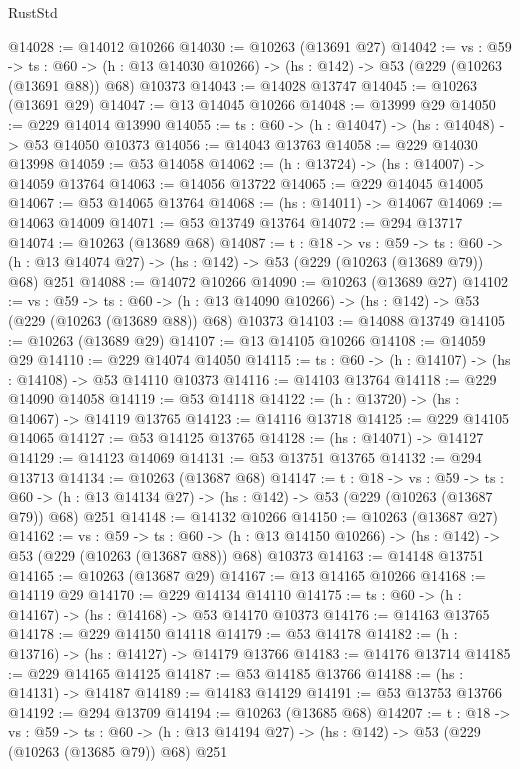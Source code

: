 \begin{lexlean}{RustStd}
\begin{coremodule}
@14028 := @14012 @10266
@14030 := @10263 (@13691 @27)
@14042 := {vs : @59} ->
  {ts : @60} ->
  (h : @13 @14030 @10266) -> (hs : @142) -> @53 (@229 (@10263 (@13691 @88)) @68) @10373
@14043 := @14028 @13747
@14045 := @10263 (@13691 @29)
@14047 := @13 @14045 @10266
@14048 := @13999 @29
@14050 := @229 @14014 @13990
@14055 := {ts : @60} -> (h : @14047) -> (hs : @14048) -> @53 @14050 @10373
@14056 := @14043 @13763
@14058 := @229 @14030 @13998
@14059 := @53 @14058
@14062 := (h : @13724) -> (hs : @14007) -> @14059 @13764
@14063 := @14056 @13722
@14065 := @229 @14045 @14005
@14067 := @53 @14065 @13764
@14068 := (hs : @14011) -> @14067
@14069 := @14063 @14009
@14071 := @53 @13749 @13764
@14072 := @294 @13717
@14074 := @10263 (@13689 @68)
@14087 := {t : @18} ->
  {vs : @59} ->
  {ts : @60} -> (h : @13 @14074 @27) -> (hs : @142) -> @53 (@229 (@10263 (@13689 @79)) @68) @251
@14088 := @14072 @10266
@14090 := @10263 (@13689 @27)
@14102 := {vs : @59} ->
  {ts : @60} ->
  (h : @13 @14090 @10266) -> (hs : @142) -> @53 (@229 (@10263 (@13689 @88)) @68) @10373
@14103 := @14088 @13749
@14105 := @10263 (@13689 @29)
@14107 := @13 @14105 @10266
@14108 := @14059 @29
@14110 := @229 @14074 @14050
@14115 := {ts : @60} -> (h : @14107) -> (hs : @14108) -> @53 @14110 @10373
@14116 := @14103 @13764
@14118 := @229 @14090 @14058
@14119 := @53 @14118
@14122 := (h : @13720) -> (hs : @14067) -> @14119 @13765
@14123 := @14116 @13718
@14125 := @229 @14105 @14065
@14127 := @53 @14125 @13765
@14128 := (hs : @14071) -> @14127
@14129 := @14123 @14069
@14131 := @53 @13751 @13765
@14132 := @294 @13713
@14134 := @10263 (@13687 @68)
@14147 := {t : @18} ->
  {vs : @59} ->
  {ts : @60} -> (h : @13 @14134 @27) -> (hs : @142) -> @53 (@229 (@10263 (@13687 @79)) @68) @251
@14148 := @14132 @10266
@14150 := @10263 (@13687 @27)
@14162 := {vs : @59} ->
  {ts : @60} ->
  (h : @13 @14150 @10266) -> (hs : @142) -> @53 (@229 (@10263 (@13687 @88)) @68) @10373
@14163 := @14148 @13751
@14165 := @10263 (@13687 @29)
@14167 := @13 @14165 @10266
@14168 := @14119 @29
@14170 := @229 @14134 @14110
@14175 := {ts : @60} -> (h : @14167) -> (hs : @14168) -> @53 @14170 @10373
@14176 := @14163 @13765
@14178 := @229 @14150 @14118
@14179 := @53 @14178
@14182 := (h : @13716) -> (hs : @14127) -> @14179 @13766
@14183 := @14176 @13714
@14185 := @229 @14165 @14125
@14187 := @53 @14185 @13766
@14188 := (hs : @14131) -> @14187
@14189 := @14183 @14129
@14191 := @53 @13753 @13766
@14192 := @294 @13709
@14194 := @10263 (@13685 @68)
@14207 := {t : @18} ->
  {vs : @59} ->
  {ts : @60} -> (h : @13 @14194 @27) -> (hs : @142) -> @53 (@229 (@10263 (@13685 @79)) @68) @251

\end{coremodule}
\end{lexlean}

